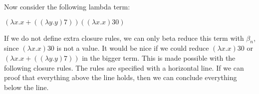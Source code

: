 \vspace{10pt}

Now consider the following lambda term:

\vspace{10pt}
$(\lambda x. x + ((\lambda y.y)7)) ((\lambda x.x)30)$

\vspace{10pt}
If we do not define extra closure rules, we can only beta reduce this term with $\beta_n$, since $(\lambda x. x) 30$ is not a value.
It would be nice if we could reduce $(\lambda x. x) 30$ or $(\lambda x. x + ((\lambda y.y)7))$ in the bigger term.
This is made possible with the following closure rules. The rules are specified with a horizontal line.
If we can proof that everything above the line holds, then we can conclude everything below the line.

